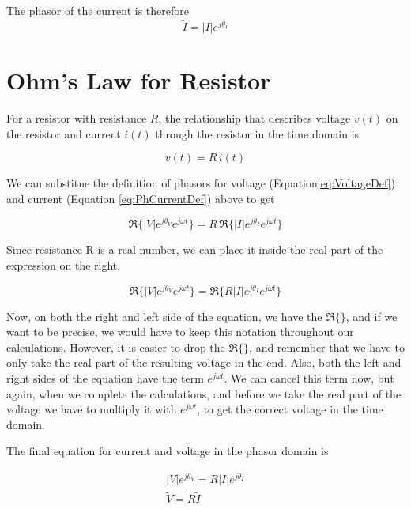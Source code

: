 \documentclass{ximera}
\begin{document}
The phasor of the current is therefore
\begin{equation}
\tilde{I}=|I|e^{j\theta_{I}}
\end{equation}



\section{Ohm's Law for Resistor}

For a  resistor with resistance $R$, the relationship that describes voltage $v(t)$ on the resistor and  current $i(t)$ through the resistor in the time domain is

\begin{equation}
v(t)=R \, i(t)
\end{equation}

We can substitue the definition of phasors for voltage (Equation\ref{eq:VoltageDef}) and current (Equation \ref{eq:PhCurrentDef})  above to get

\begin{equation}
 \Re\{|V|e^{j\theta_{V}} e^{j \omega t}\}   = R \, \Re\{|I|e^{j\theta_{I}} e^{j \omega t}\}
\end{equation}

Since resistance R is a real number, we can place it inside the real part of the expression on the right.

\begin{equation}
 \Re\{|V|e^{j\theta_{V}} e^{j \omega t}\}   =   \Re\{ R |I|e^{j\theta_{I}} e^{j \omega t}\}
\end{equation}

Now, on both the right and left side of the equation, we have the $\Re\{\}$, and if we want to be precise, we would have to keep this notation throughout our calculations. However, it is easier to drop the $\Re\{\}$, and remember that we have to only take the real part of the resulting voltage in the end. Also, both the left and right sides of the equation have the term $e^{j \omega t}$. We can cancel this term now, but again, when we complete the calculations, and before we take the real part of the voltage we have to multiply it with $e^{j \omega t}$, to get the correct voltage in the time domain.

The final equation for current and voltage in the phasor domain is

\begin{eqnarray}
|V|e^{j\theta_{V}}    =  R |I|e^{j\theta_{I}}  \\
\tilde{V} = R \tilde{I}
\end{eqnarray}
\end{document}
